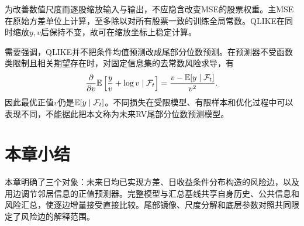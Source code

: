为改善数值尺度而逐股缩放输入与输出，不应隐含改变MSE的股票权重。主MSE在原始方差单位上计算，至多除以对所有股票一致的训练全局常数。QLIKE在同时缩放$y,v$后保持不变，故可在缩放坐标上稳定计算。

需要强调，QLIKE并不把条件均值预测改成尾部分位数预测。在预测器不受函数类限制且相关期望存在时，对固定信息集的去常数风险求导，有
\begin{equation}\label{eq:qlike_optimum}
\frac{\partial}{\partial v}\mathbb E\left[\frac{y}{v}+\log v\mid\mathcal F_t\right]
=\frac{v-\mathbb E[y\mid\mathcal F_t]}{v^2}.
\end{equation}
因此最优正值$v$仍是$\mathbb E[y\mid\mathcal F_t]$。不同损失在受限模型、有限样本和优化过程中可以表现不同，不能据此把本文称为未来RV尾部分位数预测模型。

\section{本章小结}
本章明确了三个对象：未来日均已实现方差、日收益条件分布构造的风险边，以及用边调节邻居信息的正值预测器。完整模型与汇总基线共享自身历史、公共信息和风险汇总，使逐边增量接受直接比较。尾部镜像、尺度分解和底层参数对照共同限定了风险边的解释范围。
